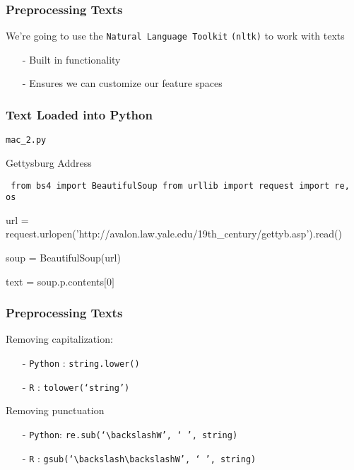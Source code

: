 \documentclass{beamer}
\numberwithin{equation}{section}
\begin{document}
\begin{frame}
\frametitle{Preprocessing Texts}

We're going to use the {\tt Natural Language Toolkit} {\tt (nltk)} to work with texts \\
\begin{itemize}
\item[-] Built in functionality
\item[-] Ensures we can customize our feature spaces
\end{itemize}

\end{frame}


\begin{frame}
\frametitle{Text Loaded into Python}


{\tt mac\_2.py}

Gettysburg Address

\vspace{0.25in}
\begin{footnotesize}

{\tt
from bs4 import BeautifulSoup
from urllib import request 
import re, os

url  = request.urlopen('http://avalon.law.yale.edu/19th\_century/gettyb.asp').read()


soup = BeautifulSoup(url)


text = soup.p.contents$[$0$]$\\

}

\end{footnotesize}

\end{frame}




\begin{frame}
\frametitle{Preprocessing Texts}

Removing capitalization:
\begin{itemize}
\item[-] {\tt Python} : \alert{{\tt string.lower()}}
\item[-] {\tt R} : \alert{{\tt tolower(`string')}}
\end{itemize}
Removing punctuation
\begin{itemize}
\item[-] {\tt Python}: \alert{{\tt re.sub(`$\backslash$W', ` ', string)}}
\item[-] {\tt R} : \alert{{\tt gsub(`$\backslash\backslash$W', ` ', string)}}
\end{itemize}


\end{frame}
\end{document}
